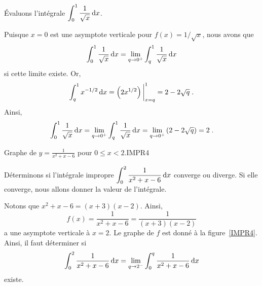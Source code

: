 {\begin{egg}
Évaluons l'intégrale
$\displaystyle \int_0^1 \frac{1}{\sqrt{x}} \,\mathrm{d}x$.

Puisque $x=0$ est une asymptote verticale pour $f(x)=1/\sqrt{x}$, nous
avons que
\[
\int_0^1 \frac{1}{\sqrt{x}} \,\mathrm{d}x =
\lim_{q\rightarrow 0^+} \int_q^1 \frac{1}{\sqrt{x}} \,\mathrm{d}x
\]
si cette limite existe.  Or,
\[
\int_q^1 x^{-1/2} \,\mathrm{d}x = \left( 2x^{1/2} \right)\bigg|_{x=q}^1
= 2 - 2\sqrt{q} \; .
\]
Ainsi,
\[
\int_0^1 \frac{1}{\sqrt{x}} \,\mathrm{d}x =
\lim_{q\rightarrow 0^+} \int_q^1 \frac{1}{\sqrt{x}} \,\mathrm{d}x
=\lim_{q\rightarrow 0^+} \left( 2 - 2\sqrt{q} \right) = 2 \; .
\]
\end{egg}

{Graphe de $\displaystyle y=\frac{1}{x^2+x-6}$ pour $0\leq x < 2$.}{IMPR4} 

\begin{egg}
Déterminons si l'intégrale impropre
$\displaystyle \int_0^2 \frac{1}{x^2+x-6} \,\mathrm{d}x$ converge ou diverge.
Si elle converge, nous allons donner la valeur de l'intégrale.

Notons que $x^2+x-6 = (x+3)(x-2)$.  Ainsi,
\[
f(x) = \frac{1}{x^2+x-6} = \frac{1}{(x+3)(x-2)}
\]
a une asymptote verticale à $x=2$.  Le graphe de $f$ est donné à la
figure~\ref{IMPR4}.  Ainsi, il faut déterminer si
\[
\int_0^2 \frac{1}{x^2+x-6} \,\mathrm{d}x
= \lim_{q\rightarrow 2^-} \int_0^q \frac{1}{x^2+x-6} \,\mathrm{d}x
\]
existe.


\end{egg}}
